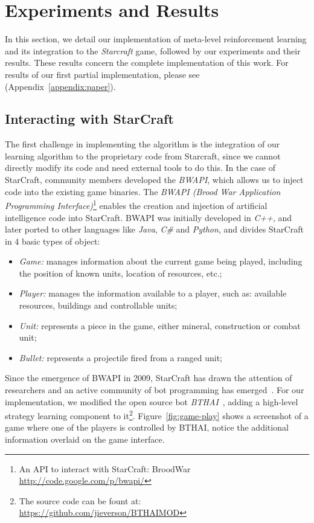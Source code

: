 \chapter{Experiments and Results}
\label{chapter:results}

In this section, we detail our implementation of meta-level reinforcement learning and its integration to the \emph{Starcraft} game, followed by our experiments and their results. 
These results concern the complete implementation of this work.
For results of our first partial implementation, please see~\cite{mypaper} (Appendix~\ref{appendix:paper}).



\section{Interacting with StarCraft}
\label{sec:bwapi}

The first challenge in implementing the algorithm is the integration of our learning algorithm to the proprietary code from Starcraft, since we cannot directly modify its code and need external tools to do this. 
In the case of StarCraft, community members developed the \textit{BWAPI}, which allows us to inject code into the existing game binaries. 
The \textit{BWAPI (Brood War Application Programming Interface)}\footnote{An API to interact with StarCraft: BroodWar \url{http://code.google.com/p/bwapi/}} enables the creation and injection of artificial intelligence code into StarCraft. 
BWAPI was initially developed in \textit{C++}, and later ported to other languages like \textit{Java}, \textit{C\#} and \textit{Python}, and divides StarCraft in 4 basic types of object:


\begin{itemize}
\item \textit{Game:} manages information about the current game being played, 
including the position of known units, location of resources, etc.;
\item \textit{Player:} manages the information available to a player, such as: 
available resources, buildings and controllable units;
\item \textit{Unit:} represents a piece in the game, either mineral, construction or combat unit;
\item \textit{Bullet:} represents a projectile fired from a ranged unit;
\end{itemize}

Since the emergence of BWAPI in 2009, StarCraft has drawn the attention of researchers and an active community of bot programming has emerged~\cite{buro2012real}. 
For our implementation, we modified the open source bot \textit{BTHAI}~\cite{hagelback2012potential},
adding a high-level strategy learning component to it\footnote{The source code can be fount at: \url{https://github.com/jieverson/BTHAIMOD}}.
Figure~\ref{fig:game-play} shows a screenshot of a game where one of the players is controlled by BTHAI, notice the additional information overlaid on the game interface. 

